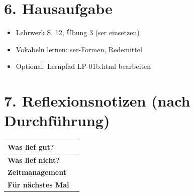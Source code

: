 \documentclass[11pt, a4paper]{article}
\begin{document}
\section*{6. Hausaufgabe}

\begin{itemize}
    \item Lehrwerk S. 12, Übung 3 (ser einsetzen)
    \item Vokabeln lernen: ser-Formen, Redemittel
    \item Optional: Lernpfad LP-01b.html bearbeiten
\end{itemize}


\section*{7. Reflexionsnotizen (nach Durchführung)}

\begin{tabularx}{\textwidth}{|l|X|}
\hline
\textbf{Was lief gut?} & \\[2em]
\hline
\textbf{Was lief nicht?} & \\[2em]
\hline
\textbf{Zeitmanagement} & \\[2em]
\hline
\textbf{Für nächstes Mal} & \\[2em]
\hline
\end{tabularx}
\end{document}
